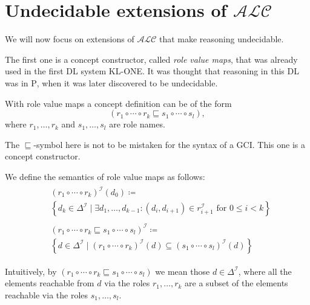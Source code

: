 \section{Undecidable extensions of $\mathcal{ALC}$}
We will now focus on extensions of $\mathcal{ALC}$ that make reasoning undecidable.

The first one is a concept constructor, called \textit{role value maps}, that was already used in the first DL system \textsc{KL-ONE}.
It was thought that reasoning in this DL was in \textsc{P}, when it was later discovered to be undecidable.

\begin{definition*}
	With role value maps a concept definition can be of the form
	\[
		\left( r_1 \circ \cdots \circ r_k \sqsubseteq s_1 \circ \cdots \circ s_l \right)
	,\]
	where $r_1, \ldots, r_k$ and $s_1, \ldots, s_l$ are role names.
	\begin{note}
		The $\sqsubseteq$-symbol here is not to be mistaken for the syntax of a GCI.
		This one is a concept constructor.
	\end{note}

	We define the semantics of role value maps as follows:
	\begin{align*}
		\begin{split}
			&\left( r_1 \circ \cdots \circ r_k \right)^\mathcal{I} (d_0) \coloneqq \\
			&\left\{ d_k \in \Delta^\mathcal{I} \mid \exists d_1,\ldots,d_{k-1}: (d_i, d_{i+1}) \in r_{i+1}^\mathcal{I} \text{ for } 0 \leq i < k \right\}
		\end{split}
		\\[3ex]
		\begin{split}
			&\left(r_1 \circ \cdots \circ r_k \sqsubseteq s_1 \circ \cdots \circ s_l \right)^\mathcal{I} \coloneqq \\
			&\left\{ d \in \Delta^\mathcal{I} \mid (r_1 \circ \cdots \circ r_k)^\mathcal{I}(d) \subseteq (s_1 \circ \cdots \circ s_l)^\mathcal{I}(d)\right\}
		\end{split}
	\end{align*}
\end{definition*}
\begin{note}
	Intuitively, by $\left( r_1 \circ \cdots \circ r_k \sqsubseteq s_1 \circ \cdots \circ s_l \right)$ we mean those  $d \in \Delta^\mathcal{I}$,
	where all the elements reachable from $d$ via the roles  $r_1, \ldots ,r_k$
	are a subset of the elements reachable via the roles $s_1, \ldots, s_l$.
\end{note}

